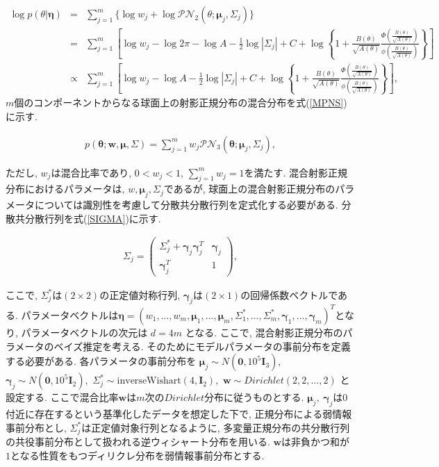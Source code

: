 \documentclass[a4j,12pt]{jarticle}
\begin{document}
\footnotesize
\begin{eqnarray}
\label{logPNC}
\log p(\theta | \bm \eta) &=& \sum^m_{j=1} \{\log w_j + \log \mathcal{PN}_2(\theta;\bm \mu_j, \Sigma_j)\} \nonumber \\ 
&=& \sum^m_{j=1} \left[ \log w_j - \log 2\pi - \log A - \frac{1}{2} \log |\Sigma_j| + C + \log \left\{1 + \frac{B(\theta)}{\sqrt{A(\theta)}} \frac{\Phi \left(\frac{B(\theta)}{\sqrt{A(\theta)}}\right)}{\phi \left(\frac{B(\theta)}{\sqrt{A(\theta)}}\right)}\right\} \right] \nonumber \\
&\propto& \sum^m_{j=1} \left[ \log w_j - \log A - \frac{1}{2} \log |\Sigma_j| + C + \log \left\{1 + \frac{B(\theta)}{\sqrt{A(\theta)}} \frac{\Phi \left(\frac{B(\theta)}{\sqrt{A(\theta)}}\right)}{\phi \left(\frac{B(\theta)}{\sqrt{A(\theta)}}\right)}\right\} \right], 
\end{eqnarray}
\normalsize
\fi
$m$個のコンポーネントからなる球面上の射影正規分布の混合分布を式(\ref{MPNS})に示す. 

\begin{eqnarray}
\label{MPNS}
p(\bm \theta;\bm w,\bm \mu, \Sigma) = \sum^m_{j=1} w_j \mathcal{PN}_3(\bm \theta;\bm \mu_j, \Sigma_j),
\end{eqnarray}

\noindent
ただし, $w_j$は混合比率であり, $0 < w_j < 1$, $\sum^m_{j=1} w_j = 1$を満たす. 混合射影正規分布におけるパラメータは, $w, \bm \mu_j, \Sigma_j$であるが, 球面上の混合射影正規分布のパラメータについては識別性を考慮して分散共分散行列を定式化する必要がある. 分散共分散行列を式(\ref{SIGMA})に示す.

\begin{eqnarray}
\label{SIGMA}
 \Sigma_j = \left(
    \begin{array}{cc}
      \Sigma^*_j + \bm \gamma_j \bm \gamma_j^T & \bm \gamma_j \\
      \bm \gamma_j^T & 1
    \end{array}
  \right),
\end{eqnarray}

\noindent
ここで, $\Sigma^*_j$は$(2 \times 2)$の正定値対称行列, $\bm \gamma_j$は$(2 \times 1)$の回帰係数ベクトルである. パラメータベクトルは$\bm \eta = (w_1, \dots, w_m, \bm \mu_1, \dots, \bm \mu_m, \Sigma^*_1, \dots, \Sigma^*_m, \bm \gamma_1, \dots, \bm \gamma_m)^T$となり, パラメータベクトルの次元は $d = 4m$ となる. ここで, 混合射影正規分布のパラメータのベイズ推定を考える. そのためにモデルパラメータの事前分布を定義する必要がある. 各パラメータの事前分布を $\bm \mu_j \sim N(\bm 0, 10^5 \bm I_3)$,\ $\bm \gamma_j \sim  N(\bm 0, 10^5 \bm I_2)$,\ $\Sigma^*_j \sim \mathrm{inverse Wishart}(4,\bm I_2)$,\ $\bm w \sim Dirichlet(2,2, \dots, 2)$ と設定する. ここで混合比率$\bm w$は$m$次の$Dirichlet$分布に従うものとする. $\bm \mu_j,\ \bm \gamma_j$は$0$付近に存在するという基準化したデータを想定した下で, 正規分布による弱情報事前分布とし, $\Sigma^*_j$は正定値対象行列となるように, 多変量正規分布の共分散行列の共役事前分布として扱われる逆ウィシャート分布を用いる. $\bm w$は非負かつ和が $1$となる性質をもつディリクレ分布を弱情報事前分布とする.
\end{document}
